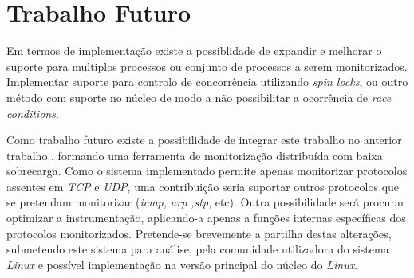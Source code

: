 \section{Trabalho Futuro}

Em termos de implementação existe a possiblidade de expandir e melhorar o suporte para multiplos processos ou conjunto de processos a serem monitorizados.
Implementar suporte para controlo de concorrência utilizando \textit{spin locks}, ou outro método com suporte no núcleo de modo a não possibilitar a ocorrência de \textit{race conditions}.

Como trabalho futuro existe a possibilidade de integrar este trabalho no anterior trabalho \cite{duarte10,Farruca:2009}, formando uma ferramenta de monitorização distribuída com baixa sobrecarga.
 Como o sistema implementado permite apenas monitorizar protocolos assentes em \textit{TCP} e \textit{UDP}, uma contribuição seria suportar outros protocolos que se pretendam monitorizar (\textit{icmp, arp ,stp}, etc).
 Outra possibilidade será procurar optimizar a instrumentação, aplicando-a apenas a funções internas específicas dos protocolos monitorizados.
 Pretende-se brevemente a partilha destas alterações, submetendo este sistema para análise, pela comunidade utilizadora do sistema \textit{Linux} e possível implementação na versão principal do núcleo do \textit{Linux}.


